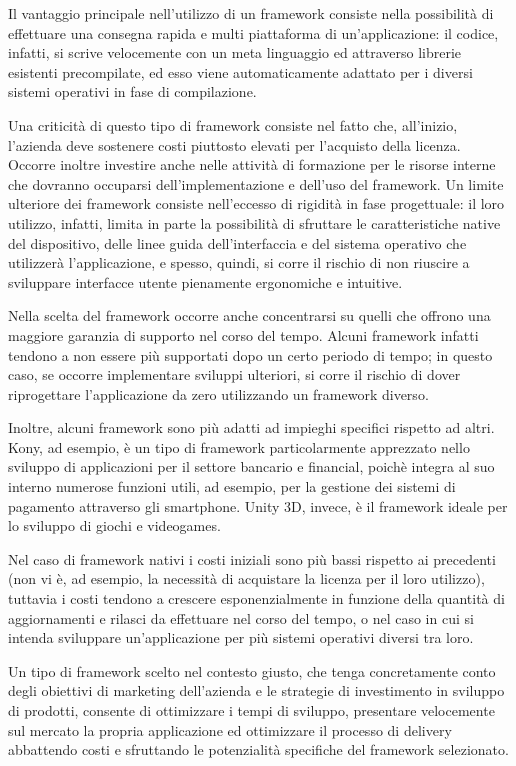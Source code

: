 Il vantaggio principale nell'utilizzo di un framework consiste nella possibilità di effettuare una consegna rapida e multi piattaforma di un'applicazione: il codice, infatti, si scrive velocemente con un meta linguaggio ed attraverso librerie esistenti precompilate, ed esso viene automaticamente adattato per i diversi sistemi operativi in fase di compilazione.

Una criticità di questo tipo di framework consiste nel fatto che, all'inizio, l'azienda deve sostenere costi piuttosto elevati per l'acquisto della licenza. Occorre inoltre investire anche nelle attività di formazione per le risorse interne che dovranno occuparsi dell'implementazione e dell'uso del framework. Un limite ulteriore dei framework consiste nell'eccesso di rigidità in fase progettuale: il loro utilizzo, infatti, limita in parte la possibilità di sfruttare le caratteristiche native del dispositivo, delle linee guida dell'interfaccia e del sistema operativo che utilizzerà l'applicazione, e spesso, quindi, si corre il rischio di non riuscire a sviluppare interfacce utente pienamente ergonomiche e intuitive.

Nella scelta del framework occorre anche concentrarsi su quelli che offrono una maggiore garanzia di supporto nel corso del tempo. Alcuni framework infatti tendono a non essere più supportati dopo un certo periodo di tempo; in questo caso, se occorre implementare sviluppi ulteriori, si corre il rischio di dover riprogettare l'applicazione da zero utilizzando un framework diverso.

Inoltre, alcuni framework sono più adatti ad impieghi specifici rispetto ad altri. Kony, ad esempio, è un tipo di framework particolarmente apprezzato nello sviluppo di applicazioni per il settore bancario e financial, poichè integra al suo interno numerose funzioni utili, ad esempio, per la gestione dei sistemi di pagamento attraverso gli smartphone. Unity 3D, invece, è il framework ideale per lo sviluppo di giochi e videogames.

Nel caso di framework nativi i costi iniziali sono più bassi rispetto ai precedenti (non vi è, ad esempio, la necessità di acquistare la licenza per il loro utilizzo), tuttavia i costi tendono a crescere esponenzialmente in funzione della quantità di aggiornamenti e rilasci da effettuare nel corso del tempo, o  nel caso in cui si intenda sviluppare un’applicazione per più sistemi operativi diversi tra loro.

Un tipo di framework scelto nel contesto giusto, che tenga concretamente conto degli obiettivi di marketing dell'azienda e le strategie di investimento in sviluppo di prodotti, consente di ottimizzare i tempi di sviluppo, presentare velocemente sul mercato la propria applicazione ed ottimizzare il processo di delivery abbattendo costi e sfruttando le potenzialità specifiche del framework selezionato.

